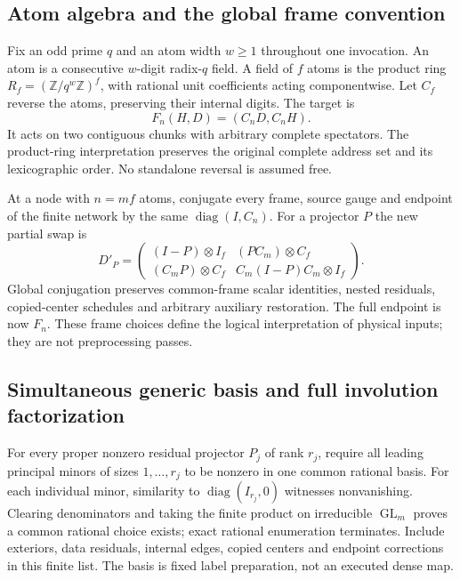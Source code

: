 \subsection{Atom algebra and the global frame convention}
Fix an odd prime $q$ and an atom width $w\ge1$ throughout one invocation.
An atom is a consecutive $w$-digit radix-$q$ field. A field of $f$ atoms
is the product ring $R_f=(\mathbb Z/q^w\mathbb Z)^f$, with rational
unit coefficients acting componentwise. Let $C_f$ reverse the atoms,
preserving their internal digits. The target is
\[
 F_n(H,D)=(C_nD,C_nH).
\]
It acts on two contiguous chunks with arbitrary complete spectators.
The product-ring interpretation preserves the original complete address
set and its lexicographic order. No standalone reversal is assumed free.

At a node with $n=mf$ atoms, conjugate every frame, source gauge and
endpoint of the finite network by the same $\operatorname{diag}(I,C_n)$.
For a projector $P$ the new partial swap is
\[
 D'_P=\begin{pmatrix}
 (I-P)\otimes I_f&(PC_m)\otimes C_f\\
 (C_mP)\otimes C_f&C_m(I-P)C_m\otimes I_f
 \end{pmatrix}.
\]
Global conjugation preserves common-frame scalar identities, nested
residuals, copied-center schedules and arbitrary auxiliary restoration.
The full endpoint is now $F_n$. These frame choices define the logical
interpretation of physical inputs; they are not preprocessing passes.

\subsection{Simultaneous generic basis and full involution factorization}
For every proper nonzero residual projector $P_j$ of rank $r_j$, require
all leading principal minors of sizes $1,\ldots,r_j$ to be nonzero in
one common rational basis. For each individual minor, similarity to
$\operatorname{diag}(I_{r_j},0)$ witnesses nonvanishing. Clearing
denominators and taking the finite product on irreducible
$\operatorname{GL}_m$ proves a common rational choice exists; exact
rational enumeration terminates. Include exteriors, data residuals,
internal edges, copied centers and endpoint corrections in this finite
list. The basis is fixed label preparation, not an executed dense map.

